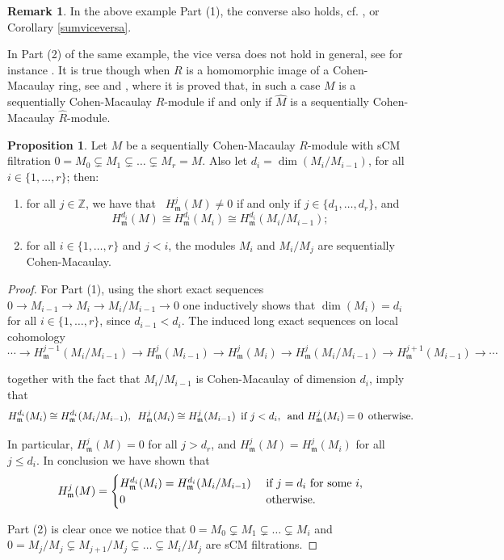 \documentclass[12pt]{amsart}
\theoremstyle{definition}
\newtheorem{proposition}[theorem]{Proposition}
\theoremstyle{definition}
\newtheorem{remark}[theorem]{Remark}
\newcommand{\m}{\mathfrak{m}}
\def\NZQ{\mathbb}               %
\def\ZZ{{\NZQ Z}}
\def\frk{\mathfrak}               %
\def\mm{{\frk m}}
\renewcommand{\leq}{\leqslant}
\begin{document}
{        
      \begin{remark}\label{perdopo} In the above example Part (1),  the converse also holds, cf. \cite[Proposition 4.5]{CN03}, \cite[Proposition 3.2]{TPDA18} or Corollary \ref{sumviceversa}.

        \smallskip
        \noindent
 In Part (2) of the same example,  the vice versa does not hold in general, see for instance \cite[Example 6.1]{Sch99}. It is true though when $R$ is a homomorphic image of a Cohen-Macaulay ring, see  \cite[Corollaries 2.8]{GHS10} and \cite[Corollaries 2.9]{GHS10}, where it is proved that, in such a case $M$ is a sequentially Cohen-Macaulay $R$-module if and only if $\widehat{M}$ is a sequentially Cohen-Macaulay $\widehat{R}$-module.        
      \end{remark}
      
\begin{proposition}\label{sullecoom}
  Let $M$ be a sequentially Cohen-Macaulay $R$-module with sCM filtration $0=M_0 \subsetneq M_1 \subsetneq \ldots \subsetneq M_r=M$. Also let $d_i=\dim(M_{i}/M_{i-1})$, for all  $i \in \{1,\ldots,r\}$; then:

  \begin{enumerate}[(1)]
  \item for all $j \in \ZZ$,  we have that\,\,\,
    $H^j_\m(M) \ne 0$ if and only if  $j \in \{d_1,\ldots,d_r\}$, and  $$H^{d_i}_\mm(M)\cong H^{d_i}_\mm(M_i) \cong H^{d_i}_\mm(M_i/M_{i-1});$$
  \item for all $i \in \{1,\ldots,r\}$ and $j < i$, the modules $M_i$ and $M_i/M_j$ are sequentially Cohen-Macaulay.
  \end{enumerate}

\end{proposition}
\begin{proof}
For Part (1), using the short exact sequences $0 \to M_{i-1} \to M_i \to M_i/M_{i-1} \to 0$ one inductively shows that $\dim(M_i) = d_i$ for all $i \in \{1,\ldots,r\}$, since $d_{i-1}<d_i$. The induced long exact sequences on local cohomology
\[
\cdots\to H^{j-1}_\m(M_i/M_{i-1}) \to H^j_\m(M_{i-1}) \to  H^j_\m(M_i) \to H^j_\m(M_i/M_{i-1}) \to  H^{j+1}_\m(M_{i-1})\to\cdots
\]

\noindent
together with the fact that $M_i/M_{i-1}$ is Cohen-Macaulay of dimension $d_i$, imply  that
$$H^{d_i}_\m(M_i) \cong H^{d_i}_\m(M_i/M_{i-1}),\,\,\, H^j_\m(M_i) \cong H^j_\m(M_{i-1}) \text{\, if } j<d_i,\text{\, and } H^j_\m(M_i)=0 \text{\, otherwise}.$$

\noindent
In particular, $H^j_\m(M) =0$ for all $j>d_r$, and $H^j_\m(M) = H^j_\m(M_i)$ for all $j\leq d_i$.  In conclusion we have shown  that
\[
H^j_\m(M) = \begin{cases} H^{d_i}_\m(M_i) = H^{d_i}_\m(M_i/M_{i-1}) & \text{ if } j=d_i \text{ for some } i, \\ 0 & \text{\,\,otherwise}.
\end{cases} 
\]



Part (2) is clear once we notice that $0 =M_0 \subsetneq M_1 \subsetneq \ldots \subsetneq M_i$ and $0=M_j/M_j \subsetneq M_{j+1}/M_j \subsetneq \ldots \subsetneq M_i/M_j$ are sCM filtrations.
\end{proof}
}
\end{document}
